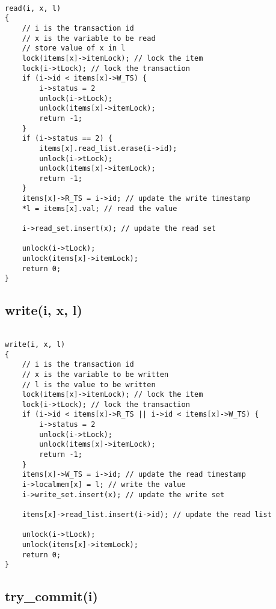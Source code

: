 \documentclass[12pt]{article}
\begin{document}
\begin{lstlisting}

read(i, x, l)
{
    // i is the transaction id
    // x is the variable to be read
    // store value of x in l
    lock(items[x]->itemLock); // lock the item
    lock(i->tLock); // lock the transaction
    if (i->id < items[x]->W_TS) {
        i->status = 2
        unlock(i->tLock);
        unlock(items[x]->itemLock);
        return -1;
    }
    if (i->status == 2) {
        items[x].read_list.erase(i->id);
        unlock(i->tLock);
        unlock(items[x]->itemLock);
        return -1;
    }
    items[x]->R_TS = i->id; // update the write timestamp
    *l = items[x].val; // read the value
    
    i->read_set.insert(x); // update the read set

    unlock(i->tLock);
    unlock(items[x]->itemLock);
    return 0;
}

\end{lstlisting}

\subsection*{write(i, x, l)}

\begin{lstlisting}

write(i, x, l)
{
    // i is the transaction id
    // x is the variable to be written
    // l is the value to be written
    lock(items[x]->itemLock); // lock the item
    lock(i->tLock); // lock the transaction
    if (i->id < items[x]->R_TS || i->id < items[x]->W_TS) {
        i->status = 2
        unlock(i->tLock);
        unlock(items[x]->itemLock);
        return -1;
    }
    items[x]->W_TS = i->id; // update the read timestamp
    i->localmem[x] = l; // write the value
    i->write_set.insert(x); // update the write set

    items[x]->read_list.insert(i->id); // update the read list
    
    unlock(i->tLock);
    unlock(items[x]->itemLock);
    return 0;
}

\end{lstlisting}

\subsection*{try\_commit(i)}
\end{document}
